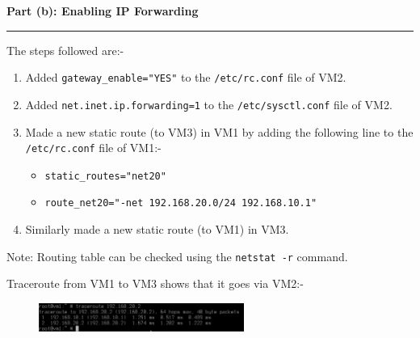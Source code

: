 \documentclass[a4paper,12pt]{article}
\newenvironment{solution}[2][]{%
\begin{mdframed}[linecolor=blue!70!black, linewidth=2pt, roundcorner=10pt, backgroundcolor=yellow!10!white, skipabove=12pt, skipbelow=12pt]%
	\textbf{\large #2}
	\par\noindent\rule{\textwidth}{0.4pt}
}{
\end{mdframed}
}
\begin{document}
\begin{solution}{Part (b): Enabling IP Forwarding}
    The steps followed are:-
    \begin{enumerate}
        \item Added \texttt{gateway\_enable="YES"} to the \texttt{/etc/rc.conf} file of VM2.
        \item Added \texttt{net.inet.ip.forwarding=1} to the \texttt{/etc/sysctl.conf} file of VM2.
        \item Made a new static route (to VM3) in VM1 by adding the following line to the \texttt{/etc/rc.conf} file of VM1:-
        \begin{itemize}
            \item \texttt{static\_routes="net20"}
            \item \texttt{route\_net20="-net 192.168.20.0/24 192.168.10.1"}
        \end{itemize}
        \item Similarly made a new static route (to VM1) in VM3.
    \end{enumerate}
    Note: Routing table can be checked using the \texttt{netstat -r} command.

    Traceroute from VM1 to VM3 shows that it goes via VM2:-
    \begin{figure}[H]
        \centering
        \includegraphics[width=0.6\textwidth]{traceroute.png}
    \end{figure}
\end{solution}
\end{document}
